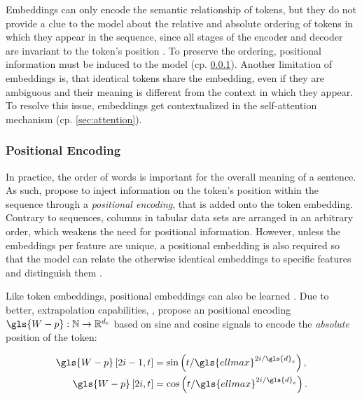 Embeddings can only encode the semantic relationship of tokens, but they do not provide a clue to the model about the relative and absolute ordering of tokens in which they appear in the sequence, since all stages of the encoder and decoder are invariant to the token's position \autocite[][72]{tunstallNaturalLanguageProcessing2022}. To preserve the ordering, positional information must be induced to the model (cp. \cref{sec:positional-encoding}). Another limitation of embeddings is, that identical tokens share the embedding, even if they are ambiguous and their meaning is different from the context in which they appear. To resolve this issue, embeddings get contextualized in the self-attention mechanism (cp. \cref{sec:attention}).

\subsubsection{Positional Encoding}\label{sec:positional-encoding}

In practice, the order of words is important for the overall meaning of a sentence. As such, \textcite[][6]{vaswaniAttentionAllYou2017} propose to inject information on the token's position within the sequence through a \emph{positional encoding}, that is added onto the token embedding. Contrary to sequences, columns in tabular data sets are arranged in an arbitrary order, which weakens the need for positional information. However, unless the embeddings per feature are unique, a positional embedding is also required so that the model can relate the otherwise identical embeddings to specific features and distinguish them \autocites[][3]{huangTabTransformerTabularData2020}[][15]{somepalliSAINTImprovedNeural2021}.

Like token embeddings, positional embeddings can also be learned \autocite[cp.][4174]{devlinBERTPretrainingDeep2019}. Due to better, extrapolation capabilities, \textcite[][6]{vaswaniAttentionAllYou2017}, propose an positional encoding $\gls{W-p}: \mathbb{N} \rightarrow \mathbb{R}^{d_{e}}$ based on sine and cosine signals to encode the \emph{absolute} position of the token:

\begin{equation}
    \begin{aligned}
        \gls{W-p}\left[2 i-1, t\right] & =\sin \left(t / \gls{ellmax}^{2 i / \gls{d}_e}\right), \\
        \gls{W-p}\left[2 i, t\right]   & =\cos \left(t / \gls{ellmax}^{2 i / \gls{d}_e}\right).
    \end{aligned}
    \label{eq:sinusodal-encoding}
\end{equation}

